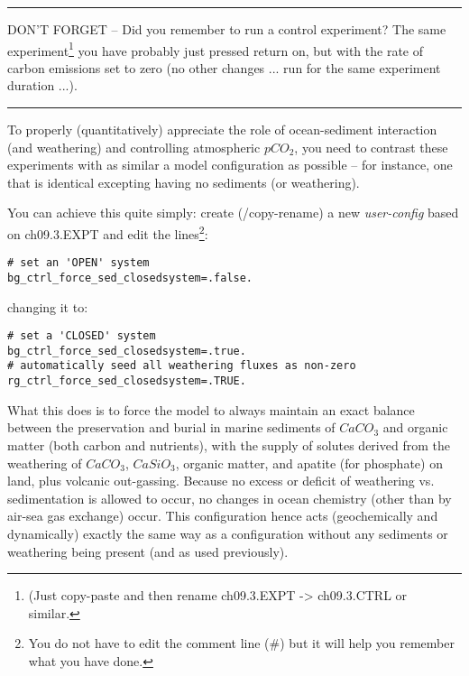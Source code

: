 \vspace{1mm}
\noindent\rule{4cm}{0.1mm}
\vspace{2mm}

\noindent DON'T FORGET -- Did you remember to run a control experiment? The same experiment\footnote{(Just copy-paste and then rename \textsf{\footnotesize ch09.3.EXPT} -> \textsf{\footnotesize ch09.3.CTRL} or similar.}  you have probably just pressed \textsf{\footnotesize return} on, but with the rate of carbon emissions set to zero (no other changes ... run for the same experiment duration ...).

\vspace{1mm}
\noindent\rule{4cm}{0.1mm}
\vspace{2mm}

\noindent To properly (quantitatively) appreciate the role of ocean-sediment interaction (and weathering) and controlling atmospheric \(pCO_{2}\), you need to contrast these experiments with as similar a model configuration as possible -- for instance, one that is identical excepting having no sediments (or weathering). 

You can achieve this quite simply: create (/copy-rename) a new \textit{user-config} based on \textsf{\footnotesize ch09.3.EXPT} and edit the lines\footnote{You do not have to edit the comment line (\#) but it will help you remember what you have done.}:
\vspace{-1mm}\small\begin{verbatim}
# set an 'OPEN' system
bg_ctrl_force_sed_closedsystem=.false.
\end{verbatim}\normalsize\vspace{-1mm}
changing it to:
\vspace{-1mm}\small\begin{verbatim}
# set a 'CLOSED' system
bg_ctrl_force_sed_closedsystem=.true.
# automatically seed all weathering fluxes as non-zero
rg_ctrl_force_sed_closedsystem=.TRUE.
\end{verbatim}\normalsize\vspace{-1mm}

\noindent What this  does is to force the model to always maintain an exact balance between the preservation and burial in marine sediments of \(CaCO_{3}\) and organic matter (both carbon and nutrients), with the supply of solutes derived from the weathering of \(CaCO_{3}\), \(CaSiO_{3}\), organic matter, and apatite (for phosphate) on land, plus volcanic out-gassing. Because no excess or deficit of weathering vs. sedimentation is allowed to occur, no changes in ocean chemistry (other than by air-sea gas exchange) occur. This configuration hence acts (geochemically and dynamically) exactly the same way as a configuration without any sediments or weathering being present (and as used previously). 


